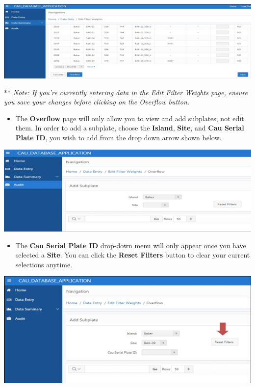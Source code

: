 \documentclass[
]{book}
\providecommand{\tightlist}{%
  \setlength{\itemsep}{0pt}\setlength{\parskip}{0pt}}
\begin{document}
\includegraphics{images/Data16.jpg}

** \emph{Note: If you're currently entering data in the Edit Filter Weights page, ensure you save your changes before clicking on the Overflow button.}

\begin{itemize}
\tightlist
\item
  The \textbf{Overflow} page will only allow you to view and add subplates, not edit them. In order to add a subplate, choose the \textbf{Island}, \textbf{Site}, and \textbf{Cau Serial Plate ID}, you wish to add from the drop down arrow shown below.
\end{itemize}

\includegraphics{images/Data17.jpg}

\begin{itemize}
\tightlist
\item
  The \textbf{Cau Serial Plate ID} drop-down menu will only appear once you have selected a \textbf{Site}. You can click the \textbf{Reset Filters} button to clear your current selections anytime.
\end{itemize}

\includegraphics{images/Data18.jpg}
\end{document}
